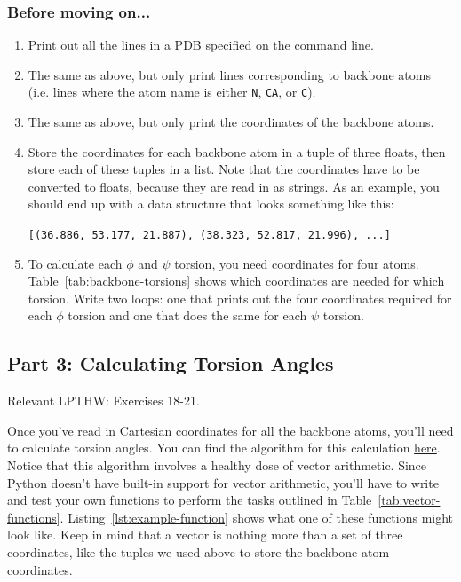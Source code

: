 \documentclass{article}
\newcommand{\bbphi}{\ensuremath{\phi}}
\newcommand{\bbpsi}{\ensuremath{\psi}}
\newenvironment{lpthw}
{Relevant LPTHW:}
{}
\newenvironment{problems}
{\subsubsection{Before moving on...} \begin{enumerate}}
{\end{enumerate}}
\begin{document}
\begin{problems}
 \item Print out all the lines in a PDB specified on the command line.

 \item The same as above, but only print lines corresponding to backbone atoms 
  (i.e. lines where the atom name is either \texttt{N}, \texttt{CA}, or 
  \texttt{C}).

 \item The same as above, but only print the coordinates of the backbone atoms.

 \item Store the coordinates for each backbone atom in a tuple of three floats, 
  then store each of these tuples in a list.  Note that the coordinates have to 
  be converted to floats, because they are read in as strings.  As an example, 
  you should end up with a data structure that looks something like this: 

  \texttt{[(36.886, 53.177, 21.887), (38.323, 52.817, 21.996), ...]}

 \item To calculate each \bbphi{} and \bbpsi{} torsion, you need coordinates 
  for four atoms.  Table~\ref{tab:backbone-torsions} shows which coordinates 
  are needed for which torsion.  Write two loops: one that prints out the four 
  coordinates required for each \bbphi{} torsion and one that does the same for 
  each \bbpsi{} torsion.

\end{problems}

\subsection{Part 3: Calculating Torsion Angles}

\begin{lpthw}
Exercises 18-21.
\end{lpthw}

Once you've read in Cartesian coordinates for all the backbone atoms, you'll 
need to calculate torsion angles.  You can find the algorithm for this 
calculation 
\href{http://math.stackexchange.com/questions/47059/how-do-i-calculate-a-dihedral-angle-given-cartesian-coordinates}{here}.  
Notice that this algorithm involves a healthy dose of vector arithmetic.  Since 
Python doesn't have built-in support for vector arithmetic, you'll have to 
write and test your own functions to perform the tasks outlined in 
Table~\ref{tab:vector-functions}.  Listing~\ref{lst:example-function} shows 
what one of these functions might look like.  Keep in mind that a vector is 
nothing more than a set of three coordinates, like the tuples we used above to 
store the backbone atom coordinates.  
\end{document}
